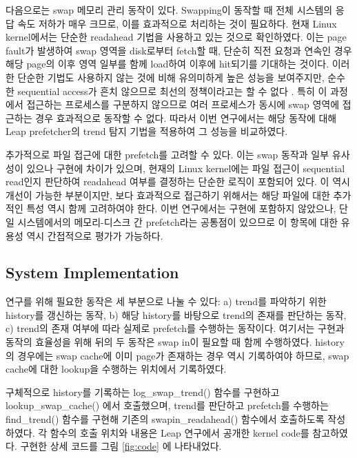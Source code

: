 \documentclass[conference,11pt]{IEEEtran}
\begin{document}
\begin{CJK}{UTF8}{}
    다음으로는 swap 메모리 관리 동작이 있다. Swapping이 동작할 때 전체 시스템의 응답 속도 저하가 매우 크므로, 이를 효과적으로 처리하는 것이 필요하다. 현재 Linux kernel에서는 단순한 readahead 기법을 사용하고 있는 것으로 확인하였다. 이는 page fault가 발생하여 swap 영역을 disk로부터 fetch할 때, 단순히 직전 요청과 연속인 경우 해당 page의 이후 영역 일부를 함께 load하여 이후에 hit되기를 기대하는 것이다. 이러한 단순한 기법도 사용하지 않는 것에 비해 유의미하게 높은 성능을 보여주지만, 순수한 sequential access가 흔치 않으므로 최선의 정책이라고는 할 수 없다 \cite{lwnmmswap}. 특히 이 과정에서 접근하는 프로세스를 구분하지 않으므로 여러 프로세스가 동시에 swap 영역에 접근하는 경우 효과적으로 동작할 수 없다. 따라서 이번 연구에서는 해당 동작에 대해 Leap prefetcher의 trend 탐지 기법을 적용하여 그 성능을 비교하였다.

    추가적으로 파일 접근에 대한 prefetch를 고려할 수 있다. 이는 swap 동작과 일부 유사성이 있으나 구현에 차이가 있으며, 현재의 Linux kernel에는 파일 접근이 sequential read인지 판단하여 readahead 여부를 결정하는 단순한 로직이 포함되어 있다. 이 역시 개선이 가능한 부분이지만, 보다 효과적으로 접근하기 위해서는 해당 파일에 대한 추가적인 특성 역시 함께 고려하여야 한다. 이번 연구에서는 구현에 포함하지 않았으나, 단일 시스템에서의 메모리-디스크 간 prefetch라는 공통점이 있으므로 이 항목에 대한 유용성 역시 간접적으로 평가가 가능하다.

    \subsection{System Implementation}

    연구를 위해 필요한 동작은 세 부분으로 나눌 수 있다: a) trend를 파악하기 위한 history를 갱신하는 동작, b) 해당 history를 바탕으로 trend의 존재를 판단하는 동작, c) trend의 존재 여부에 따라 실제로 prefetch를 수행하는 동작이다. 여기서는 구현과 동작의 효율성을 위해 뒤의 두 동작은 swap in이 필요할 때 함께 수행하였다. history의 경우에는 swap cache에 이미 page가 존재하는 경우 역시 기록하여야 하므로, swap cache에 대한 lookup을 수행하는 위치에서 기록하였다.

    구체적으로 history를 기록하는 log\_swap\_trend() 함수를 구현하고 lookup\_swap\_cache() 에서 호출했으며, trend를 판단하고 prefetch를 수행하는 find\_trend() 함수를 구현해 기존의 swapin\_readahead() 함수에서 호출하도록 작성하였다. 각 함수의 호출 위치와 내용은 Leap 연구에서 공개한 kernel code를 참고하였다. 구현한 상세 코드를 그림 \ref{fig:code} 에 나타내었다.


\end{CJK}
\end{document}
